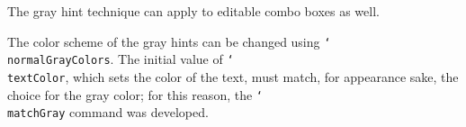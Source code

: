 \documentclass{article}
\def\cs#1{\texttt{\char`\\#1}}
\begin{document}
\begin{Form}
The gray hint technique can apply to editable combo boxes as well.\smallskip

\medskip

The color scheme of the gray hints can be changed using
\cs{normalGrayColors}. The initial value of \cs{textColor}, which sets the
color of the text, must match, for appearance sake, the choice for the gray
color; for this reason, the \cs{matchGray} command was developed.\smallskip


\medskip

\medskip

\end{Form}
\end{document}
